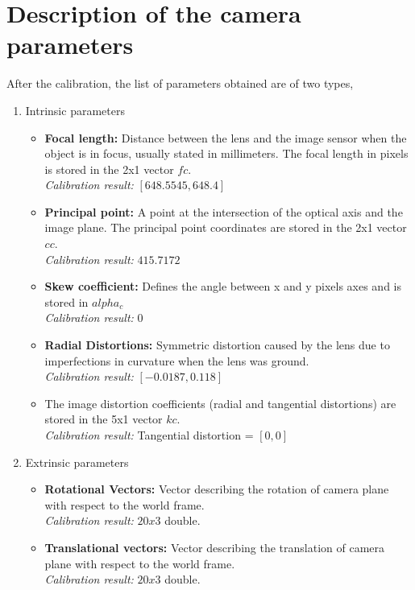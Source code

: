 \documentclass[11pt,a4paper,titlepage]{article}
\begin{document}
\section{Description of the camera parameters}
After the calibration, the list of parameters obtained are of two types,
\begin{enumerate}
\item Intrinsic parameters \begin{itemize}
\item \textbf{Focal length:} Distance between the lens and the image sensor when the object is in focus, usually stated in millimeters. The focal length in pixels is stored in the 2x1 vector $fc$. \\ \textit{Calibration result:} $[648.5545, 648.4]$
\item \textbf{Principal point:} A point at the intersection of the optical axis and the image plane. The principal point coordinates are stored in the 2x1 vector $cc$. \\ \textit{Calibration result:} $415.7172$
\item \textbf{Skew coefficient:} Defines the angle between x and y pixels axes and is stored in $alpha_c$ \\ \textit{Calibration result:} $0$
\item \textbf{Radial Distortions:} Symmetric distortion caused by the lens due to imperfections in curvature when the lens was ground. \\ \textit{Calibration result:} $[-0.0187, 0.118]$
\item The image distortion coefficients (radial and tangential distortions) are stored in the 5x1 vector $kc$. \\ \textit{Calibration result:} Tangential distortion = $[0,0]$
\end{itemize}
\item Extrinsic parameters \begin{itemize}
\item \textbf{Rotational Vectors:} Vector describing the rotation of camera plane with respect to the world frame. \\ \textit{Calibration result:} $20x3$ double.
\item \textbf{Translational vectors:} Vector describing the translation of camera plane with respect to the world frame. \\ \textit{Calibration result:} $20x3$ double.
\end{itemize}
\end{enumerate}
\end{document}
